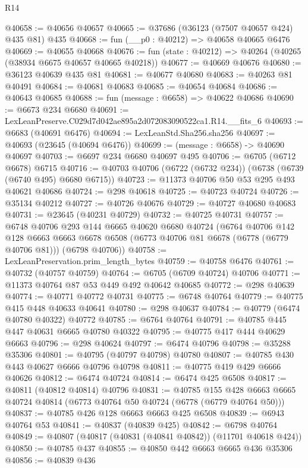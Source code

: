 \begin{lexlean}{R14}
\begin{coremodule}
@40658 := @40656 @40657
@40665 := @37686 (@36123 (@7507 @40657 @424) @435 @81) @435
@40668 := fun (__p0 : @40212) => @40658 @40665 @6476
@40669 := @40655 @40668
@40676 := fun (state : @40212) => @40264 (@40265 (@38934 @6675 @40657 @40665 @40218))
@40677 := @40669 @40676
@40680 := @36123 @40639 @435 @81
@40681 := @40677 @40680
@40683 := @40263 @81 @40491
@40684 := @40681 @40683
@40685 := @40654 @40684
@40686 := @40643 @40685
@40688 := fun (message : @6658) => @40622 @40686
@40690 := @6673 @234 @6680
@40691 := LexLeanPreserve.C029d7d042ae895a2d072083090522ca1.R14.__fits_6
@40693 := @6683 (@40691 @6476)
@40694 := LexLeanStd.Sha256.sha256
@40697 := @40693 (@23645 (@40694 @6476))
@40699 := (message : @6658) -> @40690 @40697
@40703 := @6697 @234 @6680 @40697 @495
@40706 := @6705 (@6712 @6678) @6715
@40716 := @40703 @40706 (@6722 (@6732 @234)) (@6738 (@6739 (@6740 @495) @6680 @6715))
@40723 := @11373 @40706 @50 @53 @295 @493 @40621 @40686
@40724 := @298 @40618
@40725 := @40723 @40724
@40726 := @35134 @40212
@40727 := @40726 @40676
@40729 := @40727 @40680 @40683
@40731 := @23645 (@40231 @40729)
@40732 := @40725 @40731
@40757 := @6748
    @40706
    @293
    @144
    @6665
    @40620
    @6680
    @40724
    (@6764
      @40706
      @142
      @128
      @6663
      @6663
      @6678
      @6508
      (@6773 @40706 @81 @6678 (@6778 (@6779 @40706 @81)))
      (@6798 @40706))
@40758 := LexLeanPreservation.prim_length_bytes
@40759 := @40758 @6476
@40761 := @40732 (@40757 @40759)
@40764 := @6705 (@6709 @40724) @40706
@40771 := @11373 @40764 @87 @53 @449 @492 @40642 @40685
@40772 := @298 @40639
@40774 := @40771 @40772 @40731
@40775 := @6748 @40764
@40779 := @40775 @415 @448 @40633 @40641
@40780 := @298 @40637
@40784 := @40779 (@6474 @40780 @40322) @40772
@40785 := @6764 @40764
@40791 := @40785 @445 @447 @40631 @6665 @40780 @40322
@40795 := @40775 @417 @444 @40629 @6663
@40796 := @298 @40624
@40797 := @6474 @40796
@40798 := @35288 @35306
@40801 := @40795 (@40797 @40798) @40780
@40807 := @40785 @430 @443 @40627 @6666 @40796 @40798
@40811 := @40775 @419 @429 @6666 @40626
@40812 := @6474 @40724
@40814 := @6474 @425 @6508
@40817 := @40811 (@40812 @40814) @40796
@40831 := @40785
    @155
    @428
    @6663
    @6665
    @40724
    @40814
    (@6773 @40764 @50 @40724 (@6778 (@6779 @40764 @50)))
@40837 := @40785 @426 @128 @6663 @6663 @425 @6508
@40839 := @6943 @40764 @53
@40841 := @40837 (@40839 @425)
@40842 := @6798 @40764
@40849 := @40807 (@40817 (@40831 (@40841 @40842)) (@11701 @40618 @424))
@40850 := @40785 @437
@40855 := @40850 @442 @6663 @6665 @436 @35306
@40856 := @40839 @436

\end{coremodule}
\end{lexlean}
